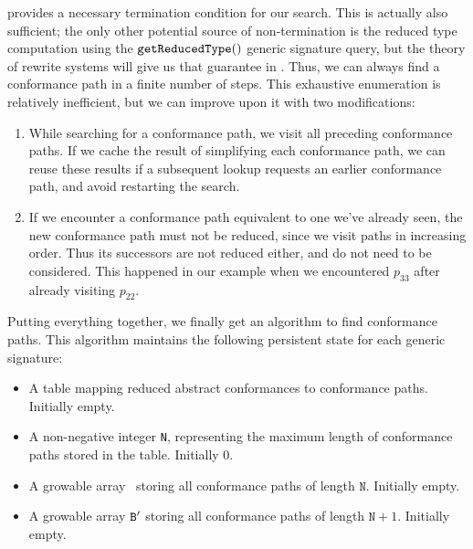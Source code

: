 \documentclass[../generics]{subfiles}
\begin{document}
 provides a necessary termination condition for our search. This is actually also sufficient; the only other potential source of non-termination is the reduced type computation using the $\texttt{getReducedType}()$ generic signature query, but the theory of rewrite systems will give us that guarantee in . Thus, we can always find a conformance path in a finite number of steps. This exhaustive enumeration is relatively inefficient, but we can improve upon it with two modifications:
\begin{enumerate}
\item While searching for a conformance path, we visit all preceding conformance paths. If we cache the result of simplifying each conformance path, we can reuse these results if a subsequent lookup requests an earlier conformance path, and avoid restarting the search.
\item If we encounter a conformance path equivalent to one we've already seen, the new conformance path must not be reduced, since we visit paths in increasing order. Thus its successors are not reduced either, and do not need to be considered. This happened in our example when we encountered $p_{33}$ after already visiting $p_{22}$.
\end{enumerate}
Putting everything together, we finally get an algorithm to find conformance paths. This algorithm maintains the following persistent state for each generic signature:
\begin{itemize}
\item A table mapping reduced abstract conformances to conformance paths. Initially empty.
\item A non-negative integer \texttt{N}, representing the maximum length of conformance paths stored in the table. Initially 0.
\item A growable array \nB\ storing all conformance paths of length $\texttt{N}$. Initially empty.
\item A growable array $\texttt{B}^\prime$ storing all conformance paths of length $\texttt{N}+1$. Initially empty.
\end{itemize}
\end{document}
